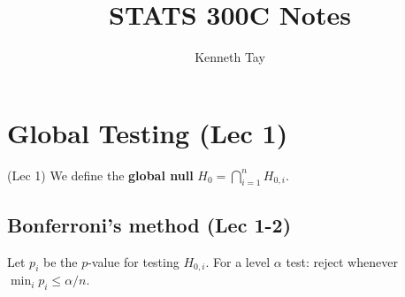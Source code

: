\documentclass[twoside]{article}
\newcommand\dis{\displaystyle}
\begin{document}
\title{STATS 300C Notes}
\author{Kenneth Tay}
\date{\vspace{-3ex}}
\maketitle

\tableofcontents

\section{Global Testing (Lec 1)}
(Lec 1) We define the \textbf{global null} $H_0 = \dis\bigcap_{i=1}^n H_{0,i}$.

\subsection{Bonferroni's method (Lec 1-2)}
Let $p_i$ be the $p$-value for testing $H_{0,i}$. For a level $\alpha$ test: reject whenever $\dis\min_i p_i \leq \alpha/n$.
\end{document}
